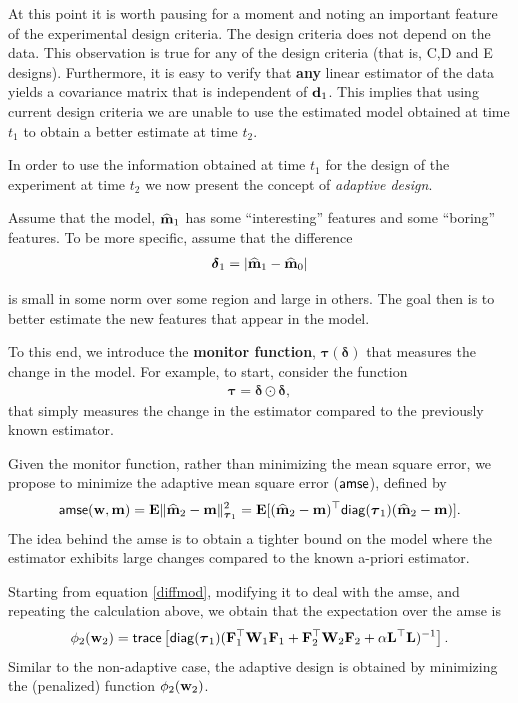 \documentclass[11pt]{article}
\newcommand{\bfE}	{{\bf{E}}}
\newcommand{\bfF}	{{\bf{F}}}
\newcommand{\bfL}	{{\bf{L}}}
\newcommand{\bfW}	{{\bf{W}}}
\newcommand{\bfd}	{{\bf{d}}}
\newcommand{\bfm}	{{\bf{m}}}
\newcommand{\bfw}	{{\bf{w}}}
\newcommand{\bftau}      {{\boldsymbol \tau}}
\newcommand{\bfdelta}	 { { \boldsymbol \delta} }
\newcommand{\LtL}       { \bfL^{\top}\bfL}
\newcommand{\bfmhat}    {{\widehat{\bfm}}}
\begin{document}
\bigskip

At this point it is worth  pausing for a moment and noting an important feature of the experimental design criteria. 
 The design criteria does not depend on the data. This observation is true for any of the 
 design criteria  (that is, C,D and E designs). 
 Furthermore, it is easy to verify that {\bf any} linear estimator of the data 
 yields a covariance matrix that is independent of $\bfd_{1}$.
 This implies that using current design criteria we are unable to
 use the estimated model obtained at time $t_{1}$  to obtain a better estimate at time $t_{2}$.

\bigskip


In order to use the information obtained at time $t_{1}$ for the design of the experiment at time $t_{2}$
 we now present the concept of {\em adaptive design}.

 Assume that the model, $\bfmhat_{1}$ has some ``interesting'' features and some ``boring'' features.
To be more specific, assume that the difference
\begin{align*}
 \bfdelta_{1} = |\bfmhat_{1} - \bfmhat_{0}|
\end{align*}


is small in some norm over some region and large in others. The goal then is to better estimate the new features
that appear in the model.

To this end, we introduce the {\bf monitor function}, $\bftau(\bfdelta)$ that measures
the change in the model. 
For example, to start, consider the function
\begin{align}
\label{taufuns}
\bftau = \bfdelta \odot \bfdelta,
\end{align}
that simply measures the change in the estimator
compared to the previously known estimator. 

Given the monitor function,
rather than minimizing the mean square error, we propose to minimize the
adaptive mean square error (${\sf amse}$), defined by
\begin{align}
\label{amse}
{\sf amse}(\bfw,\bfm) = \bfE\| \bfmhat_2 -\bfm \|_{\bftau_1}^{2} = 
 \bfE[(\bfmhat_2 -\bfm)^{\top}{\sf diag}(\bftau_1)(\bfmhat_2 -\bfm)].
 \end{align}
The idea behind the {\sf amse} is to obtain a tighter bound on the model where the estimator exhibits large changes
compared to the known a-priori estimator. 

Starting from  equation \eqref{diffmod}, modifying it to deal with the {\sf amse}, and repeating the calculation above, we obtain that the expectation 
over the {\sf amse} is
\begin{align}
\label{design2ad}
\phi_{2}(\bfw_{2}) =  {\sf trace} \left[  {\sf diag}(\bftau_1) (\bfF_{1}^{\top}\bfW_{1}\bfF_{1}   + \bfF_{2}^{\top}\bfW_{2}\bfF_{2} +
\alpha \LtL)^{-1} \right]. 
\end{align}
Similar to the non-adaptive case, the adaptive design is obtained by minimizing the (penalized) 
function $\phi_{2}(\bfw_{2})$.
\end{document}
